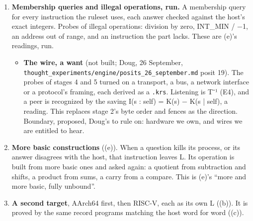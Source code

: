 \begin{enumerate}
\begin{itemize}
\begin{enumerate}
\begin{itemize}
\item \textbf{One signal for two rules, a reading.} POSIX gives the cell one signal for two rules twice over: SIGFPE for a zero divisor and for INT\_\allowbreak{}MIN / −1, and SIGSEGV for an address out of range and for a stack past its limit. Windows names each apart (0xC0000094 and 0xC0000095, 0xC0000005 and 0xC00000FD). The cell reports a stack overflow on POSIX as an address fault. Telling the two apart there needs the faulting address, read on an alternate signal stack (\texttt{sigaltstack}, \texttt{si\_\allowbreak{}addr}), and that is not built. x86 raises \#DE for both divisions (cited from knowledge); Windows reports the two as 0xC0000094 and 0xC0000095, and Linux as SIGFPE for both. AArch64 answers both with no trap, 0 and INT\_\allowbreak{}MIN, measured on the Pi. One question, 7 / 0, tells x86 from AArch64. RISC-V's −1 is in the test from knowledge and not measured.
\end{itemize}
\item \textbf{Membership queries and illegal operations, run.} A membership query for every instruction the ruleset uses, each answer checked against the host's exact integers. Probes of illegal operations: division by zero, INT\_\allowbreak{}MIN / −1, an address out of range, and an instruction the part lacks. These are (e)'s readings, run.

\begin{itemize}
\item \textbf{The wire, a want} (not built; Doug, 26 September, \texttt{thought\_\allowbreak{}experiments/\allowbreak{}engine/\allowbreak{}posits\_\allowbreak{}26\_\allowbreak{}september.\allowbreak{}md} posit 19). The probes of stages 4 and 5 turned on a transport, a bus, a network interface or a protocol's framing, each derived as a \texttt{.\allowbreak{}krs}. Listening is T⁻¹ (E4), and a peer is recognized by the saving I(s : self) = K(s) − K(s | self), a reading. This replaces stage 2's byte order and fences as the direction. Boundary, proposed, Doug's to rule on: hardware we own, and wires we are entitled to hear.
\end{itemize}
\item \textbf{More basic constructions} ((e)). When a question kills its process, or its answer disagrees with the host, that instruction leaves L. Its operation is built from more basic ones and asked again: a quotient from subtraction and shifts, a product from sums, a carry from a compare. This is (e)'s “more and more basic, fully unbound”.
\item \textbf{A second target}, AArch64 first, then RISC-V, each as its own L ((b)). It is proved by the same record programs matching the host word for word ((c)).


\end{enumerate}
\end{itemize}
\end{enumerate}
